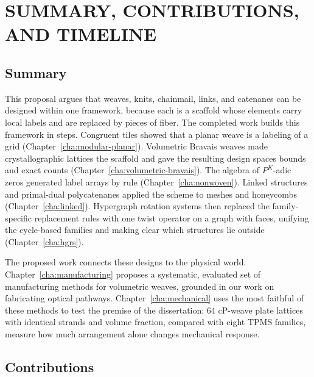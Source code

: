 %
%

\chapter{\uppercase{Summary, Contributions, and Timeline}}
\label{cha:summary}

\section{Summary}

This proposal argues that weaves, knits, chainmail, links, and catenanes can be designed within one framework, because each is a scaffold whose elements carry local labels and are replaced by pieces of fiber. The completed work builds this framework in steps. Congruent tiles showed that a planar weave is a labeling of a grid (Chapter~\ref{cha:modular-planar}). Volumetric Bravais weaves made crystallographic lattices the scaffold and gave the resulting design spaces bounds and exact counts (Chapter~\ref{cha:volumetric-bravais}). The algebra of $P^K$-adic zeros generated label arrays by rule (Chapter~\ref{cha:nonwoven}). Linked structures and primal-dual polycatenanes applied the scheme to meshes and honeycombs (Chapter~\ref{cha:linked}). Hypergraph rotation systems then replaced the family-specific replacement rules with one twist operator on a graph with faces, unifying the cycle-based families and making clear which structures lie outside (Chapter~\ref{cha:hgrs}).

The proposed work connects these designs to the physical world. Chapter~\ref{cha:manufacturing} proposes a systematic, evaluated set of manufacturing methods for volumetric weaves, grounded in our work on fabricating optical pathways. Chapter~\ref{cha:mechanical} uses the most faithful of these methods to test the premise of the dissertation: 64 cP-weave plate lattices with identical strands and volume fraction, compared with eight TPMS families, measure how much arrangement alone changes mechanical response.

\section{Contributions}

